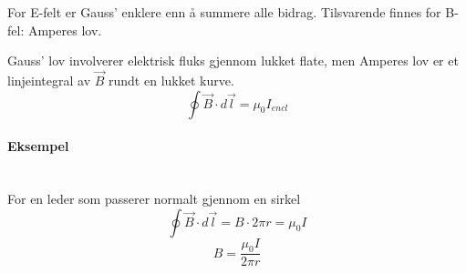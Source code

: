 For E-felt er Gauss' enklere enn å summere alle bidrag.
Tilsvarende finnes for B-fel: Amperes lov.

Gauss' lov involverer elektrisk fluks gjennom lukket flate,
men Amperes lov er et linjeintegral av $\vec{B}$ rundt en lukket kurve.
$$\oint \vec{B} \cdot d\vec{l} = \mu_0 I_{encl}$$



\paragraph{Eksempel} \hfill \\
For en leder som passerer normalt gjennom en sirkel
$$\oint\vec{B}\cdot d\vec{l} = B\cdot 2\pi r = \mu_0 I$$
$$B = \frac{\mu_0 I}{2\pi r}$$
